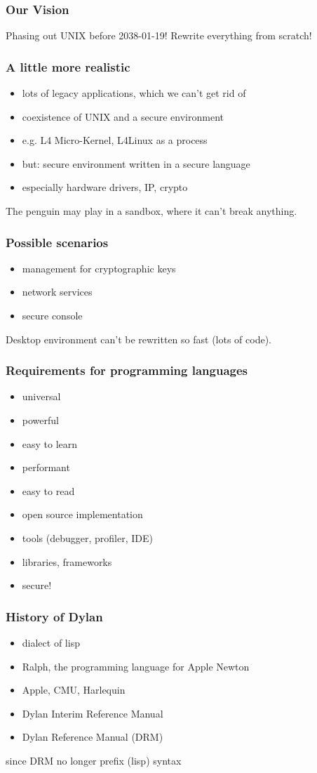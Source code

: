 \documentclass[compress]{beamer}
\begin{document}
\begin{frame}
  \frametitle{Our Vision}
  Phasing out UNIX before 2038-01-19! Rewrite everything from scratch!
\end{frame}

\begin{frame}
  \frametitle{A little more realistic}
  \begin{itemize}
  \item lots of legacy applications, which we can't get rid of
  \item coexistence of UNIX and a secure environment
  \item e.g. L4 Micro-Kernel, L4Linux as a process
  \item but: secure environment written in a secure language
  \item especially hardware drivers, IP, crypto
  \end{itemize}
  The penguin may play in a sandbox, where it can't break anything.
\end{frame}

\begin{frame}
  \frametitle{Possible scenarios}
  \begin{itemize}
  \item management for cryptographic keys
  \item network services
  \item secure console
  \end{itemize}
  Desktop environment can't be rewritten so fast (lots of code).
\end{frame}

\begin{frame}
  \frametitle{Requirements for programming languages}
  \begin{itemize}
  \item universal
  \item powerful
  \item easy to learn
  \item performant
  \item easy to read
  \item open source implementation
  \item tools (debugger, profiler, IDE)
  \item libraries, frameworks
  \item secure!
  \end{itemize}
\end{frame}

\begin{frame}
  \frametitle{History of Dylan}
  \begin{itemize}
  \item dialect of lisp
  \item Ralph, the programming language for Apple Newton
  \item Apple, CMU, Harlequin
  \item Dylan Interim Reference Manual
  \item Dylan Reference Manual (DRM)
  \end{itemize}
  since DRM no longer prefix (lisp) syntax
\end{frame}
\end{document}
